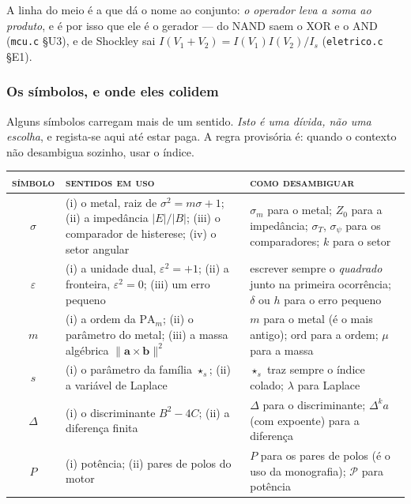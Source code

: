\documentclass[11pt]{article}
\newcommand{\code}[1]{\texttt{\small #1}}
\theoremstyle{plain}
\theoremstyle{remark}
\begin{document}
\noindent A linha do meio é a que dá o nome ao conjunto: \emph{o operador leva a soma ao
produto}, e é por isso que ele é o gerador --- do NAND saem o XOR e o AND (\code{mcu.c} §U3), e
de Shockley sai $I(V_1{+}V_2)=I(V_1)I(V_2)/I_s$ (\code{eletrico.c} §E1).

\subsubsection{Os símbolos, e onde eles colidem}

Alguns símbolos carregam mais de um sentido. \emph{Isto é uma dívida, não uma escolha}, e
regista-se aqui até estar paga. A regra provisória é: quando o contexto não desambigua sozinho,
usar o índice.

\begin{center}\small
\renewcommand{\arraystretch}{1.2}
\begin{tabular}{@{}cp{5.0cm}p{6.4cm}@{}}
\toprule
\textsc{símbolo} & \textsc{sentidos em uso} & \textsc{como desambiguar} \\
\midrule
$\sigma$ & (i) o metal, raiz de $\sigma^2=m\sigma+1$; (ii) a impedância $|E|/|B|$;
 (iii) o comparador de histerese; (iv) o setor angular
 & $\sigma_m$ para o metal; $Z_0$ para a impedância; $\sigma_{T}$, $\sigma_\psi$ para os
 comparadores; $k$ para o setor \\
$\varepsilon$ & (i) a unidade dual, $\varepsilon^2=+1$; (ii) a fronteira, $\varepsilon^2=0$;
 (iii) um erro pequeno
 & escrever sempre o \emph{quadrado} junto na primeira ocorrência; $\delta$ ou $h$ para o
 erro pequeno \\
$m$ & (i) a ordem da $\mathrm{PA}_m$; (ii) o parâmetro do metal;
 (iii) a massa algébrica $\|\mathbf a\times\mathbf b\|^2$
 & $m$ para o metal (é o mais antigo); $\mathrm{ord}$ para a ordem; $\mu$ para a massa \\
$s$ & (i) o parâmetro da família $\star_s$; (ii) a variável de Laplace
 & $\star_s$ traz sempre o índice colado; $\lambda$ para Laplace \\
$\Delta$ & (i) o discriminante $B^2-4C$; (ii) a diferença finita
 & $\Delta$ para o discriminante; $\Delta^k a$ (com expoente) para a diferença \\
$P$ & (i) potência; (ii) pares de polos do motor
 & $P$ para os pares de polos (é o uso da monografia); $\mathcal P$ para potência \\
\bottomrule
\end{tabular}
\end{center}
\end{document}
